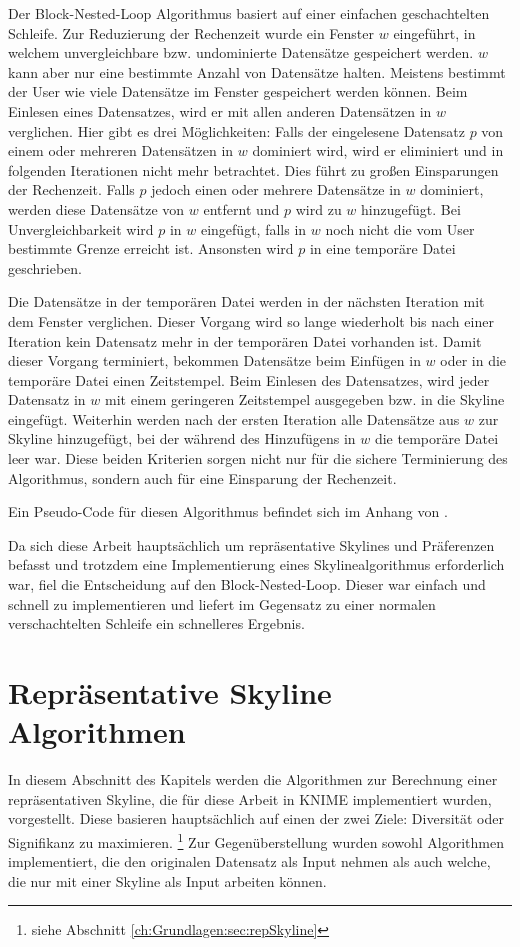 Der Block-Nested-Loop Algorithmus basiert auf einer einfachen geschachtelten Schleife. Zur Reduzierung der Rechenzeit wurde ein Fenster $w$ eingeführt, in welchem unvergleichbare bzw. undominierte Datensätze gespeichert werden. $w$ kann aber nur eine bestimmte Anzahl von Datensätze halten. Meistens bestimmt der User wie viele Datensätze im Fenster gespeichert werden können.
Beim Einlesen eines Datensatzes, wird er mit allen anderen Datensätzen in $w$ verglichen. Hier gibt es drei Möglichkeiten:
Falls der eingelesene Datensatz $p$ von einem oder mehreren Datensätzen in $w$ dominiert wird, wird er eliminiert und in folgenden Iterationen nicht mehr betrachtet. Dies führt zu großen Einsparungen der Rechenzeit. 
Falls $p$ jedoch einen oder mehrere Datensätze in $w$ dominiert, werden diese Datensätze von $w$ entfernt und $p$ wird zu $w$ hinzugefügt.
Bei Unvergleichbarkeit wird $p$ in $w$ eingefügt, falls in $w$ noch nicht die vom User bestimmte Grenze erreicht ist. Ansonsten wird $p$ in eine temporäre Datei geschrieben.

Die Datensätze in der temporären Datei werden in der nächsten Iteration mit dem Fenster verglichen. Dieser Vorgang wird so lange wiederholt bis nach einer Iteration kein Datensatz mehr in der temporären Datei vorhanden ist.
Damit dieser Vorgang terminiert, bekommen Datensätze beim Einfügen in $w$ oder in die temporäre Datei einen Zeitstempel. Beim Einlesen des Datensatzes, wird jeder Datensatz in $w$ mit einem geringeren Zeitstempel ausgegeben  bzw. in die Skyline eingefügt.
Weiterhin werden nach der ersten Iteration alle Datensätze aus $w$ zur Skyline hinzugefügt, bei der während des Hinzufügens in $w$ die temporäre Datei leer war.
Diese beiden Kriterien sorgen nicht nur für die sichere Terminierung des Algorithmus, sondern auch für eine Einsparung der Rechenzeit.

Ein Pseudo-Code für diesen Algorithmus befindet sich im Anhang von \cite{borzsony2001skyline}.

Da sich diese Arbeit hauptsächlich um repräsentative Skylines und Präferenzen befasst und trotzdem eine Implementierung eines Skylinealgorithmus erforderlich war, fiel die Entscheidung auf den Block-Nested-Loop. Dieser war einfach und schnell zu implementieren und liefert im Gegensatz zu einer normalen verschachtelten Schleife ein schnelleres Ergebnis.  
\section{Repräsentative Skyline Algorithmen}
\label{ch:Analyse:sec:repSkyAlgos}
In diesem Abschnitt des Kapitels werden die Algorithmen zur Berechnung einer repräsentativen Skyline, die für diese Arbeit in KNIME implementiert wurden, vorgestellt. 
Diese basieren hauptsächlich auf einen der zwei Ziele: Diversität oder Signifikanz zu maximieren. \footnote{siehe Abschnitt \ref{ch:Grundlagen:sec:repSkyline}}
Zur Gegenüberstellung wurden sowohl Algorithmen implementiert, die den originalen Datensatz als Input nehmen als auch welche, die nur mit einer Skyline als Input arbeiten können.
